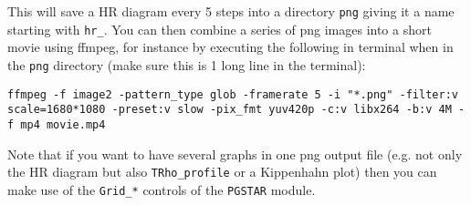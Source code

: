 \documentclass[11pt,a4paper]{article}
\begin{document}
This will save a HR diagram every 5 steps into a directory \verb'png' giving
it a name starting with \verb"hr_".
You can then combine a series of png images into a short movie using
ffmpeg, for instance by executing the following in terminal when in the
\verb'png' directory (make sure this is 1 long line in the terminal):
\begin{lstlisting}
ffmpeg -f image2 -pattern_type glob -framerate 5 -i "*.png" -filter:v scale=1680*1080 -preset:v slow -pix_fmt yuv420p -c:v libx264 -b:v 4M -f mp4 movie.mp4
\end{lstlisting}
Note that if you want to have several graphs in one png output file (e.g.
not only the HR diagram but also \verb|TRho_profile| or a Kippenhahn plot) then
you can make use of the \verb|Grid_*| controls of the \texttt{PGSTAR} module.




\end{document}
